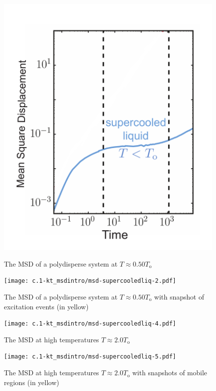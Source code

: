 \begin{frame}[c]
\begin{columns}[T]
\begin{column}[T]{0.4\textwidth}
\begin{figure}[t]
\begin{overprint}
\includegraphics[height=0.75\textheight]{c.1-kt_msdintro/msd-supercooledliq-1.pdf}\caption{The MSD of a polydisperse system at $ T \approx 0.50 T_\mathrm{o}$}

\texttt{[image: c.1-kt\_msdintro/msd-supercooledliq-2.pdf]}\caption{The MSD of a polydisperse system at $ T \approx 0.50 T_\mathrm{o}$ with snapshot of excitation events (in yellow)}




\texttt{[image: c.1-kt\_msdintro/msd-supercooledliq-4.pdf]}\caption{The MSD at high temperatures $T \approx 2.0 T_\mathrm{o}$}


\texttt{[image: c.1-kt\_msdintro/msd-supercooledliq-5.pdf]}\caption{The MSD at high temperatures $T \approx 2.0 T_\mathrm{o}$ with snapshots of mobile regions (in yellow)}


\end{overprint}
\end{figure}



\end{column}
\end{columns}
\end{frame}
